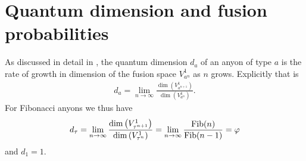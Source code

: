 \section{Quantum dimension and fusion probabilities}

As discussed in detail in \cite{preskill}, the quantum dimension $d_a$ of an anyon of type $a$ is the rate of growth in dimension of the fusion space $V_{a^n}^1$ as $n$ grows.
Explicitly that is
\begin{align}
  d_a = \lim_{n\to\infty} \frac{\operatorname{dim}\left( V^1_{a^{n+1}} \right)}{\operatorname{dim}\left( V^1_{a^{n}} \right)}.
\end{align}
For Fibonacci anyons we thus have
\begin{align}
  d_\tau = \lim_{n\to\infty} \frac{\operatorname{dim}\left( V^1_{\tau^{n+1}} \right)}{\operatorname{dim}\left( V^1_{\tau^{n}} \right)}
  = \lim_{n\to\infty} \frac{\operatorname{Fib}(n)}{\operatorname{Fib}(n-1)} = \varphi
\end{align}
and $d_1 = 1$.

